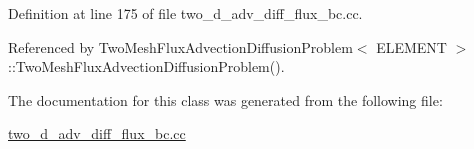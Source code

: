 Definition at line 175 of file two\+\_\+d\+\_\+adv\+\_\+diff\+\_\+flux\+\_\+bc.\+cc.



Referenced by Two\+Mesh\+Flux\+Advection\+Diffusion\+Problem$<$ E\+L\+E\+M\+E\+N\+T $>$\+::\+Two\+Mesh\+Flux\+Advection\+Diffusion\+Problem().



The documentation for this class was generated from the following file\+:\begin{DoxyCompactItemize}
\item 
\hyperlink{two__d__adv__diff__flux__bc_8cc}{two\+\_\+d\+\_\+adv\+\_\+diff\+\_\+flux\+\_\+bc.\+cc}\end{DoxyCompactItemize}
